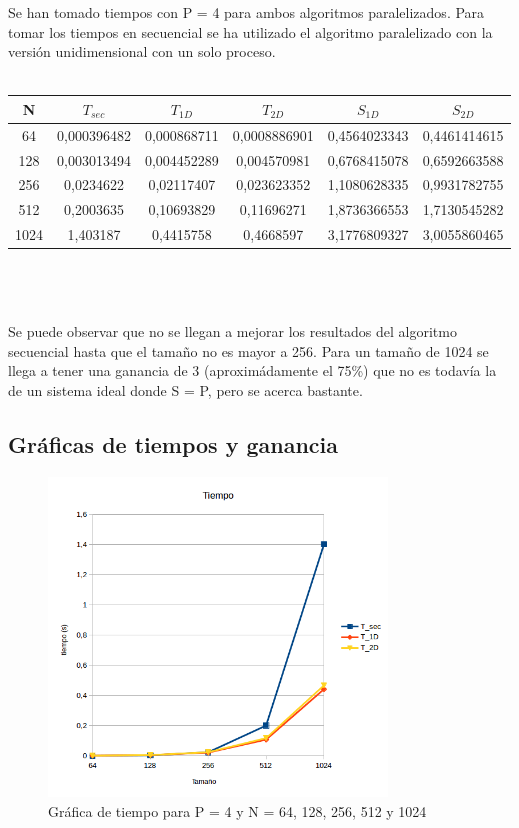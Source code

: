 Se han tomado tiempos con P = 4 para ambos algoritmos paralelizados. Para tomar los tiempos en secuencial se ha utilizado el algoritmo paralelizado con la versión unidimensional con un solo proceso.
\\ \\
\begin{tabular}{ | c | c c c | c c | }
	\hline
	N		&	$ T_{sec} $	&	$ T_{1D} $	&	$ T_{2D} $	 &	$ S_{1D} $	 &	$ S_{2D} $	\\
	\hline
	64      &	0,000396482 &	0,000868711 &	0,0008886901 &	0,4564023343 &	0,4461414615	\\
	128     &	0,003013494 &	0,004452289 &	0,004570981  &	0,6768415078 &	0,6592663588	\\
	256     &	0,0234622   &	0,02117407  &	0,023623352  &	1,1080628335 &	0,9931782755	\\
	512     &	0,2003635   &	0,10693829  &	0,11696271   &	1,8736366553 &	1,7130545282	\\
	1024    &	1,403187    &	0,4415758   &	0,4668597    &	3,1776809327 &	3,0055860465	\\
	\hline
\end{tabular}
\\ \\ \\
Se puede observar que no se llegan a mejorar los resultados del algoritmo secuencial hasta que el tamaño no es mayor a 256. Para un tamaño de 1024 se llega a tener una ganancia de 3 (aproximádamente el 75\%) que no es todavía la de un sistema ideal donde S = P, pero se acerca bastante.

\subsection{Gráficas de tiempos y ganancia}

\begin{figure}[H]
	\centering
	\includegraphics[width=9cm]{img/tiempo}
	\caption{Gráfica de tiempo para P = 4 y N = 64, 128, 256, 512 y 1024}
	\label{fig:grafica_tiempo}
\end{figure}

